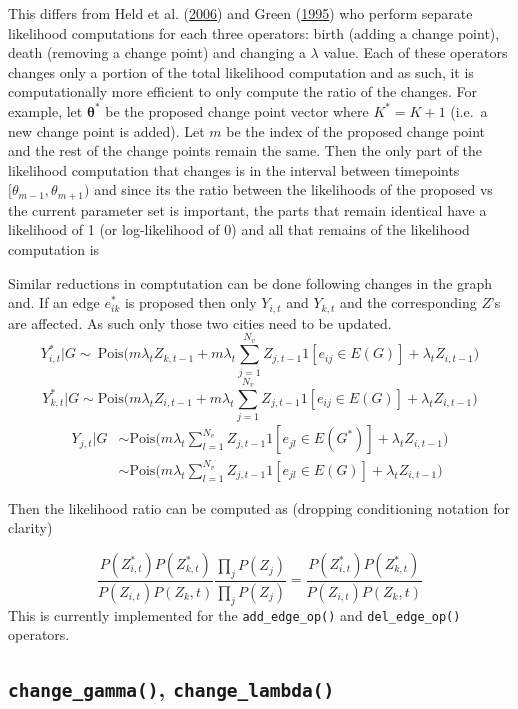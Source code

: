 \documentclass[11pt,a4paper]{article}
\numberwithin{equation}{section}
\begin{document}
This differs from Held et al.
(\protect\hyperlink{ref-held_two-component_2006}{2006}) and Green
(\protect\hyperlink{ref-green_reversible_1995}{1995}) who perform
separate likelihood computations for each three operators: birth (adding
a change point), death (removing a change point) and changing a
\(\lambda\) value. Each of these operators changes only a portion of the
total likelihood computation and as such, it is computationally more
efficient to only compute the ratio of the changes. For example, let
\(\boldsymbol{\theta^*}\) be the proposed change point vector where
\(K^* = K + 1\) (i.e.~a new change point is added). Let \(m\) be the
index of the proposed change point and the rest of the change points
remain the same. Then the only part of the likelihood computation that
changes is in the interval between timepoints
\([\theta_{m-1}, \theta_{m+1})\) and since its the ratio between the
likelihoods of the proposed vs the current parameter set is important,
the parts that remain identical have a likelihood of 1 (or
log-likelihood of 0) and all that remains of the likelihood computation
is

Similar reductions in comptutation can be done following changes in the
graph and. If an edge \(e^*_{ik}\) is proposed then only \(Y_{i,t}\) and
\(Y_{k,t}\) and the corresponding \(Z\)'s are affected. As such only
those two cities need to be updated.
\[Y^*_{i,t}|G \sim ~ \text{Pois}\big(m\lambda_tZ_{k,t-1} +m\lambda_t\sum_{j=1}^{N_v}Z_{j,t-1}1[e_{ij}\in E(G)]+ \lambda_tZ_{i,t-1}\big) \]
\[Y^*_{k,t}|G \sim  \text{Pois}\big(m\lambda_tZ_{i,t-1} +m\lambda_t\sum_{j=1}^{N_v}Z_{j,t-1}1[e_{ij}\in E(G)]+ \lambda_tZ_{i,t-1}\big) \]
\[\begin{aligned} Y_{j,t}|G &\sim \text{Pois}\big(m\lambda_t\sum_{l=1}^{N_v}Z_{j,t-1}1[e_{jl}\in E(G^*)]+ \lambda_tZ_{i,t-1}\big)\\ & \sim  \text{Pois}\big(m\lambda_t\sum_{l=1}^{N_v}Z_{j,t-1}1[e_{jl}\in E(G)]+ \lambda_tZ_{i,t-1}\big) \end{aligned}\]

Then the likelihood ratio can be computed as (dropping conditioning
notation for clarity)

\[ \frac{P(Z^*_{i,t})P(Z^*_{k,t})}{P(Z_{i,t})P(Z_k,t)}\frac{\prod_j P(Z_{j})}{\prod_{j}P( Z_{j})} = \frac{P(Z^*_{i,t})P(Z^*_{k,t})}{P(Z_{i,t})P(Z_k,t)} \]
This is currently implemented for the \texttt{add\_edge\_op()} and
\texttt{del\_edge\_op()} operators.

\hypertarget{change_gamma-change_lambda}{%
\subsection{\texorpdfstring{\texttt{change\_gamma()},
\texttt{change\_lambda()}}{change\_gamma(), change\_lambda()}}\label{change_gamma-change_lambda}}
\end{document}
